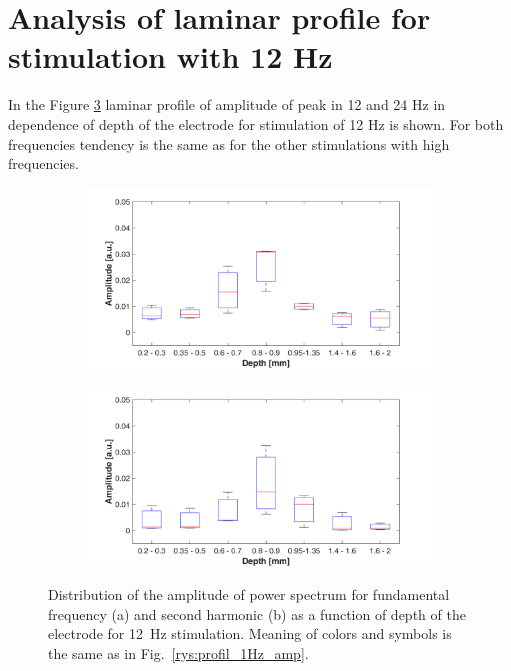 \documentclass{pracalicmgr}
\begin{document}
\section{Analysis of laminar profile for stimulation with 12 Hz}  
In the Figure \ref{rys:profil_12Hz_wid} laminar profile of amplitude of peak in 12 and 24 Hz in dependence of depth of the electrode for stimulation of 12 Hz is shown. For both frequencies tendency is the same as for the other stimulations with high frequencies.

   	\begin{figure}[H]
	\begin{subfigure}{.5\textwidth}
		\centering
		\includegraphics[width=1.\linewidth]{profile_12Hz_wid.png}
		\caption{}
		\label{rys:profil_12Hz_wid1}
	\end{subfigure}%
	\begin{subfigure}{.5\textwidth}
		\centering
		\includegraphics[width=1.\linewidth]{profile_12Hz_wid2.png}
		\caption{}
		\label{rys:profil_12Hz_wid2}
	\end{subfigure}
	\caption{Distribution of the amplitude of power spectrum for fundamental frequency (a) and second harmonic (b) as a function of depth of the electrode for 12~Hz stimulation. Meaning of colors and symbols is the same as in Fig.~\ref{rys:profil_1Hz_amp}.}
	\label{rys:profil_12Hz_wid}
\end{figure}
\end{document}

